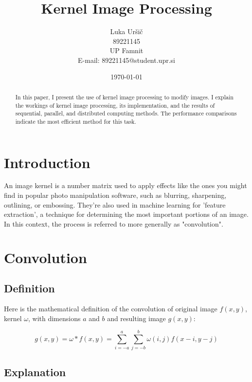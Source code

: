 \documentclass{article}
\title{Kernel Image Processing}
\author{Luka Uršič \\ 89221145 \\ UP Famnit \\ E-mail: 89221145@student.upr.si}
\date{\today}
\begin{document}
\maketitle
\thispagestyle{empty}

\begin{abstract}
    In this paper, I present the use of kernel image processing to modify images. I explain the workings of kernel image processing, its implementation, and the results of sequential, parallel, and distributed computing methods. The performance comparisons indicate the most efficient method for this task.

\end{abstract}

\begin{multicols}{2}

    \section{Introduction}
    An image kernel is a number matrix used to apply effects like the ones you might find in popular photo manipulation software, such as blurring, sharpening, outlining, or embossing. They're also used in machine learning for 'feature extraction', a technique for determining the most important portions of an image. In this context, the process is referred to more generally as "convolution".
    \cite{setosa}

    \section{Convolution}

    \subsection{Definition}

    Here is the mathematical definition of the convolution of original image $f(x, y)$, kernel $\omega$, with dimensions $a$ and $b$ and resulting image $g(x, y)$:

    \begin{equation}
        g(x, y) = \omega * f(x, y) = \sum_{i=-a}^{a} \sum_{j=-b}^{b} \omega(i, j) f(x-i, y-j)
    \end{equation}
    \cite{theodoridis2006pattern}


    \subsection{Explanation}


\end{multicols}
\end{document}
